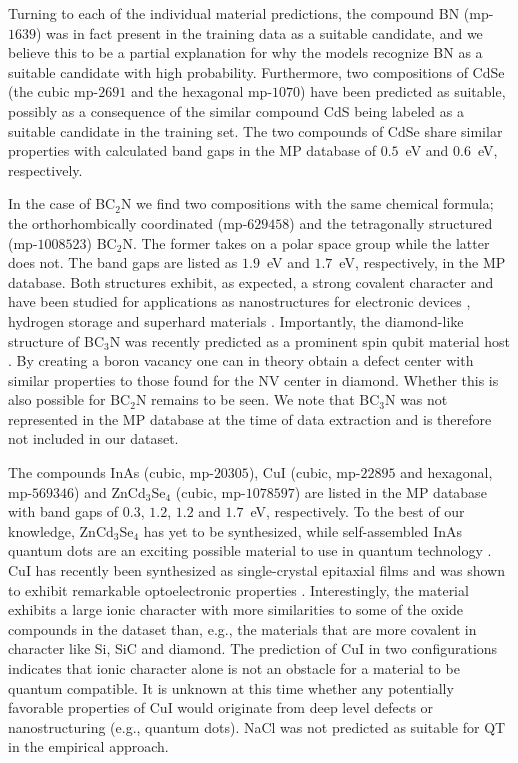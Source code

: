 \documentclass[superscriptaddress,unsortedaddress,
 amsmath,amssymb,
 aps,
]{revtex4-2}
\begin{document}
Turning to each of the individual material predictions, the compound BN (mp-$1639$) was in fact present in the training data as a suitable candidate, and we believe this to be a partial explanation for why the models recognize BN as a suitable candidate with high probability. Furthermore, two compositions of CdSe (the cubic mp-$2691$ and the hexagonal mp-$1070$) have been predicted as suitable, possibly as a consequence of the similar compound CdS being labeled as a suitable candidate in the training set. 
The two compounds of CdSe share similar properties with calculated band gaps in the MP database of $0.5$~eV and $0.6$~eV, respectively. 

In the case of BC$_2$N we find two compositions with the same chemical formula; the orthorhombically coordinated (mp-$629458$) and the tetragonally structured (mp-$1008523$) BC$_2$N. The former takes on a polar space group while the latter does not. The band gaps are listed as $1.9$~eV and $1.7$~eV, respectively, in the MP database. Both structures exhibit, as expected, a strong covalent character and have been studied for applications as nanostructures for electronic devices \cite{Gao2017}, hydrogen storage \cite{Cai2017} and superhard materials \cite{Li2017, Jiang2020}. Importantly, the diamond-like structure of BC$_3$N was recently predicted as a prominent spin qubit material host \cite{Wang2020SpinQB}. By creating a boron vacancy one can in theory obtain a defect center with similar properties to those found for the NV center in diamond. Whether this is also possible for BC$_2$N remains to be seen. We note that BC$_3$N was not represented in the MP database at the time of data extraction and is therefore not included in our dataset. 

The compounds InAs (cubic, mp-$20305$), CuI (cubic, mp-$22895$ and hexagonal, mp-$569346$) and ZnCd$_3$Se$_4$ (cubic, mp-$1078597$) are listed in the MP database with band gaps of $0.3$, $1.2$, $1.2$ and $1.7$~eV, respectively. 
To the best of our knowledge, ZnCd$_3$Se$_4$ has yet to be synthesized, while self-assembled InAs quantum dots are an exciting possible material to use in quantum technology \cite{Liu2018}. 
CuI has recently been synthesized as single-crystal epitaxial films and was shown to exhibit remarkable optoelectronic properties \cite{Ahn2020}. Interestingly, the material exhibits a large ionic character with more similarities to some of the oxide compounds in the dataset than, e.g., the materials that are more covalent in character like Si, SiC and  diamond.  
The prediction of CuI in two configurations indicates that ionic character alone is not an obstacle for a material to be quantum compatible. It is unknown at this time whether any potentially favorable properties of CuI would originate from deep level defects or  nanostructuring (e.g., quantum dots). NaCl was not predicted as suitable for QT in the empirical approach.  
\end{document}
